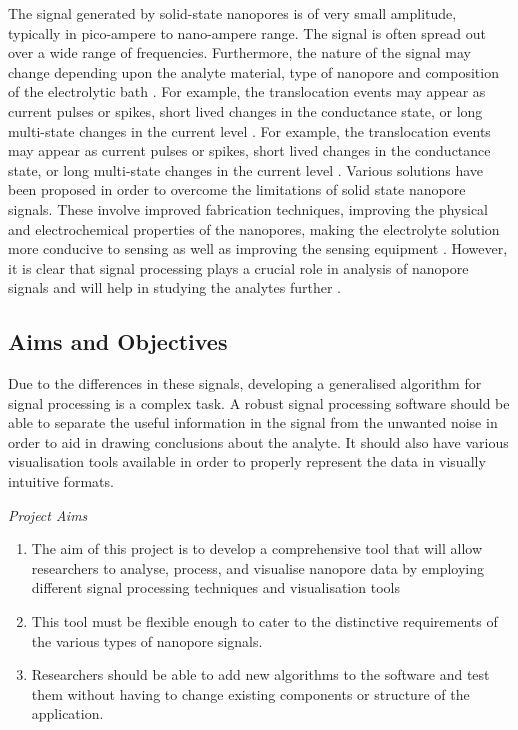 \documentclass[journal]{IEEEtran}
\begin{document}
The signal generated by solid-state nanopores is of very small amplitude, typically in pico-ampere to nano-ampere range. The signal is often spread out over a wide range of frequencies. Furthermore, the nature of the signal may change depending upon the analyte material, type of nanopore and composition of the electrolytic bath \cite{gokhaleAdvancedSignalProcessing2023}. For example, the translocation events may appear as current pulses or spikes, short lived changes in the conductance state, or long multi-state changes in the current level \cite{forstaterMOSAICModularSingleMolecule2016,varongchayakulSinglemoleculeProteinSensing2018}. For example, the translocation events may appear as current pulses or spikes, short lived changes in the conductance state, or long multi-state changes in the current level \cite{varongchayakulSinglemoleculeProteinSensing2018}. Various solutions have been proposed in order to overcome the limitations of solid state nanopore signals. These involve improved fabrication techniques, improving the physical and electrochemical properties of the nanopores, making the electrolyte solution more conducive to sensing as well as improving the sensing equipment \cite{chauMacromolecularCrowdingEnhances2020,gokhaleAdvancedSignalProcessing2023,milesSingleMoleculeSensing2012}. However, it is clear that signal processing plays a crucial role in analysis of nanopore signals and will help in studying the analytes further \cite{milesSingleMoleculeSensing2012,varongchayakulSinglemoleculeProteinSensing2018}.

\subsection{Aims and Objectives}
Due to the differences in these signals, developing a generalised algorithm for signal processing is a complex task. A robust signal processing software should be able to separate the useful information in the signal from the unwanted noise in order to aid in drawing conclusions about the analyte. It should also have various visualisation tools available in order to properly represent the data in visually intuitive formats.

\noindent \textit{Project Aims}
\begin{enumerate}
\item {The aim of this project is to develop a comprehensive tool that will allow researchers to analyse, process, and visualise nanopore data by employing different signal processing techniques and visualisation tools \cite{gokhaleAdvancedSignalProcessing2023}}
\item {This tool must be flexible enough to cater to the distinctive requirements of the various types of nanopore signals.}
\item {Researchers should be able to add new algorithms to the software and test them without having to change existing components or structure of the application.}
\end{enumerate}
\end{document}
